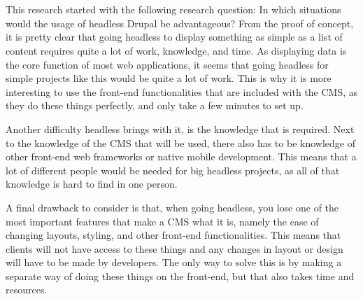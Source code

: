 
\chapter{}
\label{ch:conclusie}


This research started with the following research question: In which situations would the usage of headless Drupal be advantageous? From the proof of concept, it is pretty clear that going headless to display something as simple as a list of content requires quite a lot of work, knowledge, and time. As displaying data is the core function of most web applications, it seems that going headless for simple projects like this would be quite a lot of work. This is why it is more interesting to use the front-end functionalities that are included with the CMS, as they do these things perfectly, and only take a few minutes to set up. 


Another difficulty headless brings with it, is the knowledge that is required. Next to the knowledge of the CMS that will be used, there also has to be knowledge of other front-end web frameworks or native mobile development. This means that a lot of different people would be needed for big headless projects, as all of that knowledge is hard to find in one person.

A final drawback to consider is that, when going headless, you lose one of the most important features that make a CMS what it is, namely the ease of changing layouts, styling, and other front-end functionalities. This means that clients will not have access to these things and any changes in layout or design will have to be made by developers. The only way to solve this is by making a separate way of doing these things on the front-end, but that also takes time and resources.

